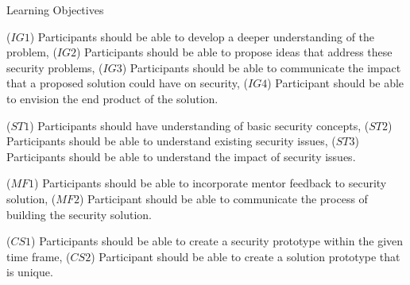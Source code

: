 
Learning Objectives

($IG1$) Participants should be able to develop a deeper understanding of the problem, ($IG2$) Participants should be able to propose ideas that address these security problems, ($IG3$) Participants should be able to communicate the impact that a proposed solution could have on security, ($IG4$) Participant should be able to envision the end product of the solution. 

($ST1$) Participants should have understanding of basic security concepts, ($ST2$) Participants should be able to understand existing security issues, ($ST3$) Participants should be able to understand the impact of security issues.

($MF1$) Participants should be able to incorporate mentor feedback to security solution, ($MF2$) Participant should be able to communicate the process of building the security solution.
 
 ($CS1$) Participants should be able to create a security prototype within the given time frame, ($CS2$) Participant should be able to create a solution prototype that is unique.
 
